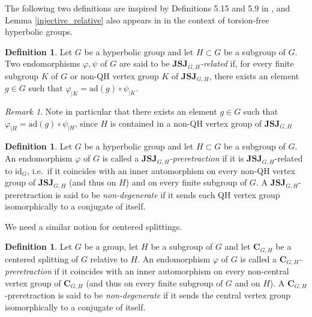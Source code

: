 \documentclass[a4paper, 11pt]{amsart}
\theoremstyle{definition}
\newtheorem{de}[te]{Definition}
\theoremstyle{remark}
\newtheorem{rk}[te]{Remark}
\begin{document}

The following two definitions are inspired by Definitions 5.15 and 5.9 in \cite{Per11}, and Lemma \ref{injective_relative} also appears in \cite{Per11} in the context of torsion-free hyperbolic groups. 

\begin{de}\label{related}Let $G$ be a hyperbolic group and let $H\subset G$ be a subgroup of $G$. Two endomorphisms $\varphi, \psi$ of $G$ are said to be \emph{$\mathbf{JSJ}_{G,H}$-related} if, for every finite subgroup $K$ of $G$ or non-QH vertex group $K$ of $\mathbf{JSJ}_{G,H}$, there exists an element $g\in G$ such that $\varphi_{\vert K}=\mathrm{ad}(g)\circ \psi_{\vert K}$.\end{de}

\begin{rk}
Note in particular that there exists an element $g\in G$ such that $\varphi_{\vert H}=\mathrm{ad}(g)\circ \psi_{\vert H}$, since $H$ is contained in a non-QH vertex group of $\mathbf{JSJ}_{G,H}$
\end{rk}

\begin{de}\label{pre_JSJ}Let $G$ be a hyperbolic group and let $H\subset G$ be a subgroup of $G$. An endomorphism $\varphi$ of $G$ is called a \emph{$\mathbf{JSJ}_{G,H}$-preretraction} if it is $\mathbf{JSJ}_{G,H}$-related to $\mathrm{id}_G$, i.e.\ if it coincides with an inner automorphism on every non-QH vertex group of $\mathbf{JSJ}_{G,H}$ (and thus on $H$) and on every finite subgroup of $G$. A $\mathbf{JSJ}_{G,H}$-preretraction is said to be \emph{non-degenerate} if it sends each QH vertex group isomorphically to a conjugate of itself.\end{de}

We need a similar notion for centered splittings.

\begin{de}\label{pre_centered}Let $G$ be a group, let $H$ be a subgroup of $G$ and let $\mathbf{C}_{G,H}$ be a centered splitting of $G$ relative to $H$. An endomorphism $\varphi$ of $G$ is called a \emph{$\mathbf{C}_{G,H}$-preretraction} if it coincides with an inner automorphism on every non-central vertex group of $\mathbf{C}_{G,H}$ (and thus on every finite subgroup of $G$ and on $H$). A $\mathbf{C}_{G,H}$-preretraction is said to be \emph{non-degenerate} if it sends the central vertex group isomorphically to a conjugate of itself.\end{de}
\end{document}
